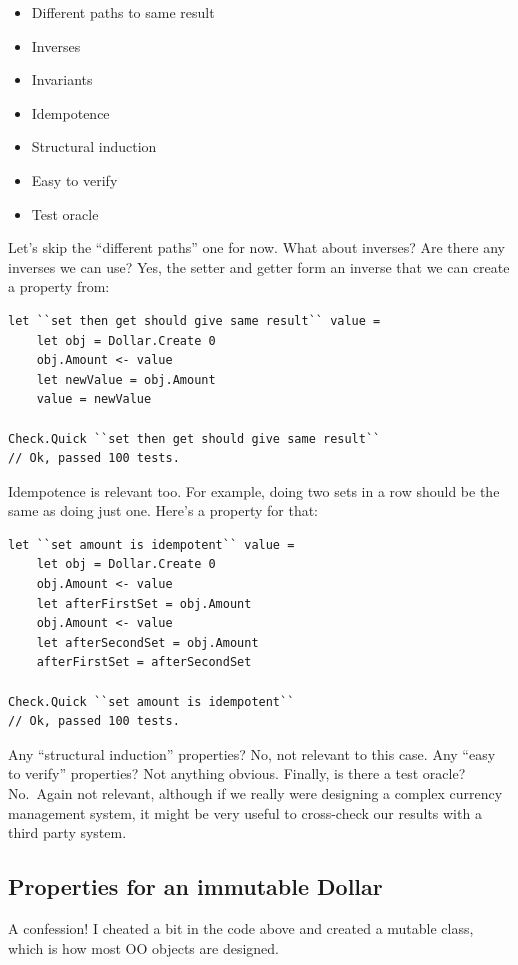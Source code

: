 \begin{itemize}
\item
  Different paths to same result
\item
  Inverses
\item
  Invariants
\item
  Idempotence
\item
  Structural induction
\item
  Easy to verify
\item
  Test oracle
\end{itemize}

Let's skip the ``different paths'' one for now. What about inverses? Are
there any inverses we can use?
Yes, the setter and getter form an inverse that we can create a property
from:

\begin{verbatim}
let ``set then get should give same result`` value = 
	let obj = Dollar.Create 0
	obj.Amount <- value
	let newValue = obj.Amount
	value = newValue 

Check.Quick ``set then get should give same result`` 
// Ok, passed 100 tests.
\end{verbatim}
Idempotence is relevant too. For example, doing two sets in a row should
be the same as doing just one. Here's a property for that:

\begin{verbatim}
let ``set amount is idempotent`` value = 
	let obj = Dollar.Create 0
	obj.Amount <- value
	let afterFirstSet = obj.Amount
	obj.Amount <- value
	let afterSecondSet = obj.Amount
	afterFirstSet = afterSecondSet 

Check.Quick ``set amount is idempotent`` 
// Ok, passed 100 tests.
\end{verbatim}
Any ``structural induction'' properties? No, not relevant to this case.
Any ``easy to verify'' properties? Not anything obvious.
Finally, is there a test oracle? No.~Again not relevant, although if we
really were designing a complex currency management system, it might be
very useful to cross-check our results with a third party system.

\subsection{Properties for an immutable
Dollar}\label{properties-for-an-immutable-dollar}

A confession! I cheated a bit in the code above and created a mutable
class, which is how most OO objects are designed.

